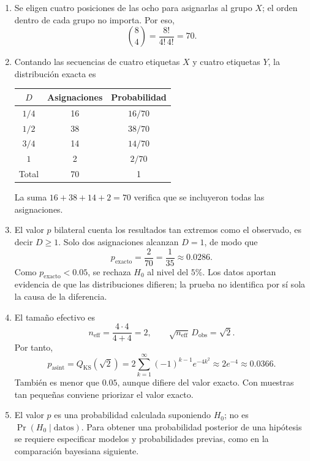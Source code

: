 \begin{enumerate}
  \item Se eligen cuatro posiciones de las ocho para asignarlas al grupo $X$; el orden dentro de cada grupo no importa. Por eso,
  \[
    \binom{8}{4}=\frac{8!}{4!\,4!}=70.
  \]
  \item Contando las secuencias de cuatro etiquetas $X$ y cuatro etiquetas $Y$, la distribución exacta es
  \begin{center}
  \begin{tabular}{@{}ccc@{}}
    \toprule
    $D$ & Asignaciones & Probabilidad\\
    \midrule
    $1/4$ & 16 & $16/70$\\
    $1/2$ & 38 & $38/70$\\
    $3/4$ & 14 & $14/70$\\
    $1$   & 2  & $2/70$\\
    \midrule
    Total & 70 & 1\\
    \bottomrule
  \end{tabular}
  \end{center}
  La suma $16+38+14+2=70$ verifica que se incluyeron todas las asignaciones.
  \item El valor $p$ bilateral cuenta los resultados tan extremos como el observado, es decir $D\ge1$. Solo dos asignaciones alcanzan $D=1$, de modo que
  \[
    p_{\mathrm{exacto}}=\frac{2}{70}=\frac{1}{35}\approx0.0286.
  \]
  Como $p_{\mathrm{exacto}}<0.05$, se rechaza $H_0$ al nivel del $5\%$. Los datos aportan evidencia de que las distribuciones difieren; la prueba no identifica por sí sola la causa de la diferencia.
  \item El tamaño efectivo es
  \[
    n_{\mathrm{eff}}=\frac{4\cdot4}{4+4}=2,
    \qquad
    \sqrt{n_{\mathrm{eff}}}\,D_{\mathrm{obs}}=\sqrt2.
  \]
  Por tanto,
  \[
    p_{\mathrm{asint}}=Q_{\mathrm{KS}}(\sqrt2)
    =2\sum_{k=1}^{\infty}(-1)^{k-1}e^{-4k^2}
    \approx2e^{-4}\approx0.0366.
  \]
  También es menor que $0.05$, aunque difiere del valor exacto. Con muestras tan pequeñas conviene priorizar el valor exacto.
  \item El valor $p$ es una probabilidad calculada suponiendo $H_0$; no es $\Pr(H_0\mid\text{datos})$. Para obtener una probabilidad posterior de una hipótesis se requiere especificar modelos y probabilidades previas, como en la comparación bayesiana siguiente.
\end{enumerate}

